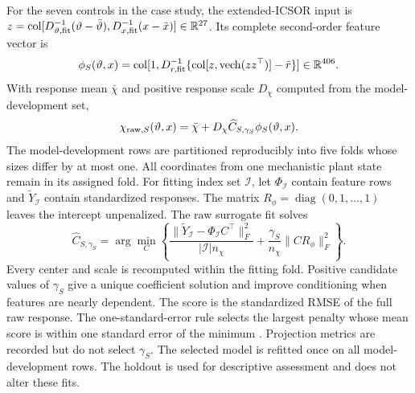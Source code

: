 \documentclass[a4paper,fleqn]{cas-sc}
\newcommand{\R}{\mathbb{R}}
\newcommand{\col}{\operatorname{col}}
\newcommand{\vech}{\operatorname{vech}}
\begin{document}
For the seven controls in the case study, the extended-ICSOR input is $z=\col[D_{\vartheta,\rm fit}^{-1}(\vartheta-\bar\vartheta),D_{x,\rm fit}^{-1}(x-\bar x)]\in\R^{27}$. Its complete second-order feature vector is
\begin{equation}
\phi_S(\vartheta,x)=\col[1,D_{r,\rm fit}^{-1}\{\col[z,\vech(zz^\top)]-\bar r\}]\in\R^{406}.
\label{eq:Sfeatures}
\end{equation}
With response mean $\bar\chi$ and positive response scale $D_\chi$ computed from the model-development set,
\begin{equation}
\chi_{{\rm raw},S}(\vartheta,x)=\bar\chi+D_\chi\widehat C_{S,\gamma_S}\phi_S(\vartheta,x).
\label{eq:Sraw}
\end{equation}
The model-development rows are partitioned reproducibly into five folds whose sizes differ by at most one. All coordinates from one mechanistic plant state remain in its assigned fold. For fitting index set $\mathcal I$, let $\Phi_{\mathcal I}$ contain feature rows and $\widetilde Y_{\mathcal I}$ contain standardized responses. The matrix $R_\phi=\operatorname{diag}(0,1,\ldots,1)$ leaves the intercept unpenalized. The raw surrogate fit solves
\begin{equation}
\widehat C_{S,\gamma_S}=\arg\min_C
\left\{\frac{\|\widetilde Y_{\mathcal I}-\Phi_{\mathcal I}C^\top\|_F^2}
{|\mathcal I|n_\chi}+\frac{\gamma_S}{n_\chi}\|CR_\phi\|_F^2\right\}.
\label{eq:Sridge}
\end{equation}
Every center and scale is recomputed within the fitting fold. Positive candidate values of $\gamma_S$ give a unique coefficient solution and improve conditioning when features are nearly dependent. The score is the standardized RMSE of the full raw response. The one-standard-error rule selects the largest penalty whose mean score is within one standard error of the minimum \citep{Hastie2009}. Projection metrics are recorded but do not select $\gamma_S$. The selected model is refitted once on all model-development rows. The holdout is used for descriptive assessment and does not alter these fits.
\end{document}
